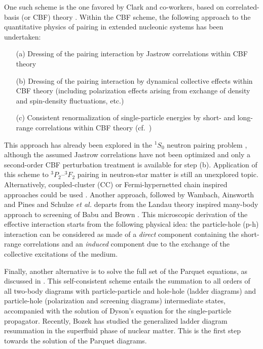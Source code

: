 \documentclass[rmp,aps,floatfix]{revtex4}
\begin{document}
One such scheme is the one favored by Clark and co-workers, based on 
correlated-basis (or CBF) theory \cite{bishop,chen86,chen93}. Within the CBF scheme, 
the following approach to the quantitative physics of pairing in
extended nucleonic systems has been undertaken:
\begin{enumerate}
\item[(a)]
Dressing of the pairing interaction by Jastrow correlations within 
CBF theory \cite{kroclark,ksj}
\item[(b)]
Dressing of the pairing interaction by dynamical collective effects
within CBF theory \cite{ksj,chen86,chen93} (including polarization effects 
arising from exchange of density and spin-density fluctuations, etc.) 
\item[(c)]
Consistent renormalization of single-particle energies by short-
and long-range correlations within CBF theory (cf.\ \cite{kcj})
\end{enumerate}
This approach has already been explored in the $^1S_0$ neutron pairing
problem \cite{chen86,chen93}, although the assumed Jastrow correlations
have not been optimized and only a second-order CBF perturbation
treatment is available for step (b).  Application of this scheme 
to $^3P_2$--$^3F_2$ pairing in neutron-star matter is 
still an unexplored topic.
Alternatively, coupled-cluster (CC) \cite{bishop} or Fermi-hypernetted chain 
inspired approaches could be used \cite{adelchi97}.
Another approach, followed by Wambach, Ainsworth and Pines \cite{ains89a,ains89b} and
Schulze {\em et al.} \cite{sclbl96} departs from the  Landau theory inspired 
many-body approach to screening of  Babu and Brown 
\cite{bb72,back85,jack82,dick81,dick83,dickoffherbert87}. 
This microscopic derivation 
of the effective interaction starts from the following physical idea: 
the particle-hole (p-h) interaction can be considered as made of a 
{\em direct} component containing the short-range correlations and an 
{\em induced} component due to the exchange of the collective excitations 
of the medium. 

Finally, another alternative is to solve the full set of the 
Parquet equations, as discussed in \cite{jls82,mhj98}. 
This  self-consistent scheme entails the summation to all orders 
of all two-body diagrams
with particle-particle and hole-hole (ladder diagrams) 
and particle-hole (polarization and screening diagrams) intermediate states,
accompanied with the solution of Dyson's equation for the single-particle
propagator.
Recently, Bozek \cite{bozek2002} has studied the generalized ladder diagram
resummation in the superfluid phase of nuclear matter. This is the first step
towards the solution of the Parquet diagrams.  
\end{document}
